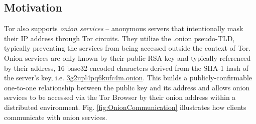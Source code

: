 \documentclass[USenglish,oneside,twocolumn]{article}
\begin{document}
\subsection{Motivation}

Tor also supports \emph{onion services} -- anonymous servers that intentionally mask their IP address through Tor circuits. They utilize the .onion pseudo-TLD, typically preventing the services from being accessed outside the context of Tor. Onion services are only known by their public RSA key and typically referenced by their address, 16 base32-encoded characters derived from the SHA-1 hash of the server's key, i.e. \url{3g2upl4pq6kufc4m.onion}. This builds a publicly-confirmable one-to-one relationship between the public key and its address and allows onion services to be accessed via the Tor Browser by their onion address within a distributed environment. Fig. \ref{fig:OnionCommunication} illustrates how clients communicate with onion services.
\end{document}
